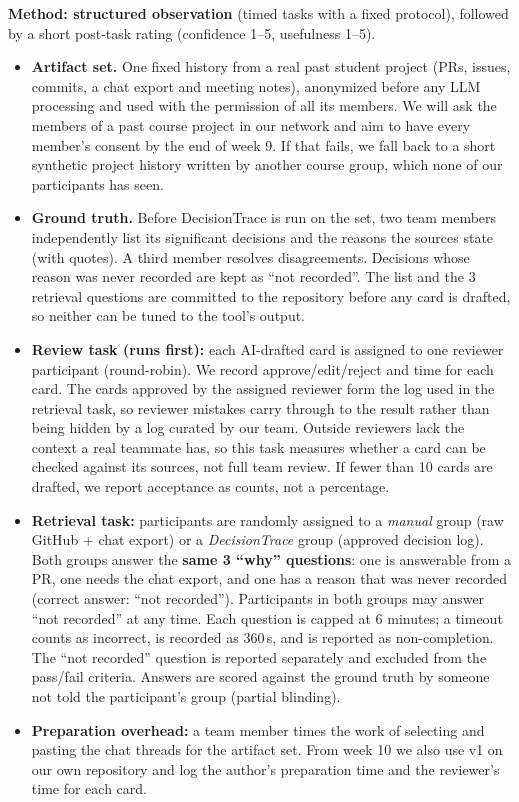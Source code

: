 \documentclass[11pt,a4paper]{article}
\begin{document}
\textbf{Method: structured observation} (timed tasks with a fixed protocol), followed by a short post-task rating (confidence 1--5, usefulness 1--5).
\begin{itemize}
  \item \textbf{Artifact set.} One fixed history from a real past student project (PRs, issues, commits, a chat export and meeting notes), anonymized before any LLM processing and used with the permission of all its members. We will ask the members of a past course project in our network and aim to have every member's consent by the end of week 9. If that fails, we fall back to a short synthetic project history written by another course group, which none of our participants has seen.
  \item \textbf{Ground truth.} Before DecisionTrace is run on the set, two team members independently list its significant decisions and the reasons the sources state (with quotes). A third member resolves disagreements. Decisions whose reason was never recorded are kept as ``not recorded''. The list and the 3 retrieval questions are committed to the repository before any card is drafted, so neither can be tuned to the tool's output.
  \item \textbf{Review task (runs first):} each AI-drafted card is assigned to one reviewer participant (round-robin). We record approve/edit/reject and time for each card. The cards approved by the assigned reviewer form the log used in the retrieval task, so reviewer mistakes carry through to the result rather than being hidden by a log curated by our team. Outside reviewers lack the context a real teammate has, so this task measures whether a card can be checked against its sources, not full team review. If fewer than 10 cards are drafted, we report acceptance as counts, not a percentage.
  \item \textbf{Retrieval task:} participants are randomly assigned to a \emph{manual} group (raw GitHub + chat export) or a \emph{DecisionTrace} group (approved decision log). Both groups answer the \textbf{same 3 ``why'' questions}: one is answerable from a PR, one needs the chat export, and one has a reason that was never recorded (correct answer: ``not recorded''). Participants in both groups may answer ``not recorded'' at any time. Each question is capped at 6 minutes; a timeout counts as incorrect, is recorded as 360\,s, and is reported as non-completion. The ``not recorded'' question is reported separately and excluded from the pass/fail criteria. Answers are scored against the ground truth by someone not told the participant's group (partial blinding).
  \item \textbf{Preparation overhead:} a team member times the work of selecting and pasting the chat threads for the artifact set. From week 10 we also use v1 on our own repository and log the author's preparation time and the reviewer's time for each card.
\end{itemize}
\end{document}
